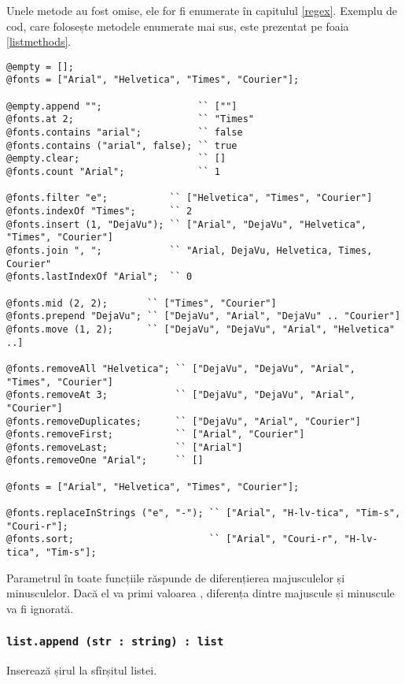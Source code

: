 Unele metode au fost omise, ele for fi enumerate în capitulul \ref{regex}. Exemplu de cod, care folosește metodele enumerate mai sus, este prezentat pe foaia \ref{listmethods}. 

\begin{lstlisting}[caption=Metodele clasei list, label=listmethods]
@empty = [];
@fonts = ["Arial", "Helvetica", "Times", "Courier"];

@empty.append "";                 `` [""]
@fonts.at 2;                      `` "Times"
@fonts.contains "arial";          `` false
@fonts.contains ("arial", false); `` true
@empty.clear;                     `` []
@fonts.count "Arial";             `` 1

@fonts.filter "e";           `` ["Helvetica", "Times", "Courier"]
@fonts.indexOf "Times";      `` 2
@fonts.insert (1, "DejaVu"); `` ["Arial", "DejaVu", "Helvetica", "Times", "Courier"]
@fonts.join ", ";            `` "Arial, DejaVu, Helvetica, Times, Courier"
@fonts.lastIndexOf "Arial";  `` 0

@fonts.mid (2, 2);       `` ["Times", "Courier"]
@fonts.prepend "DejaVu"; `` ["DejaVu", "Arial", "DejaVu" .. "Courier"]
@fonts.move (1, 2);      `` ["DejaVu", "DejaVu", "Arial", "Helvetica" ..]

@fonts.removeAll "Helvetica"; `` ["DejaVu", "DejaVu", "Arial", "Times", "Courier"]
@fonts.removeAt 3;            `` ["DejaVu", "DejaVu", "Arial", "Courier"]
@fonts.removeDuplicates;      `` ["DejaVu", "Arial", "Courier"]
@fonts.removeFirst;           `` ["Arial", "Courier"]
@fonts.removeLast;            `` ["Arial"]
@fonts.removeOne "Arial";     `` []

@fonts = ["Arial", "Helvetica", "Times", "Courier"];

@fonts.replaceInStrings ("e", "-"); `` ["Arial", "H-lv-tica", "Tim-s", "Couri-r"];
@fonts.sort;                        `` ["Arial", "Couri-r", "H-lv-tica", "Tim-s"];
\end{lstlisting}

Parametrul  în toate funcțiile răspunde de diferențierea majusculelor și minusculelor. Dacă el va primi valoarea \false, diferența dintre majuscule și minuscule va fi ignorată.

\subsubsection{\lstinline|list.append (str : string) : list|}

Inserează șirul  la sfîrșitul listei.

